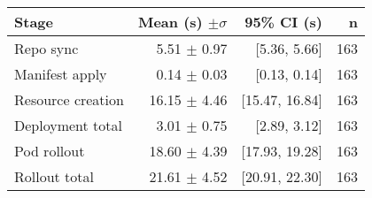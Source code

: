\begin{tabular}{l r r r}
\toprule
\textbf{Stage} & \textbf{Mean (s) $\pm \sigma$} & \textbf{95\% CI (s)} & \textbf{n} \\
\midrule
Repo sync & 5.51 $\pm$ 0.97 & [5.36, 5.66] & 163 \\
Manifest apply & 0.14 $\pm$ 0.03 & [0.13, 0.14] & 163 \\
Resource creation & 16.15 $\pm$ 4.46 & [15.47, 16.84] & 163 \\
Deployment total & 3.01 $\pm$ 0.75 & [2.89, 3.12] & 163 \\
Pod rollout & 18.60 $\pm$ 4.39 & [17.93, 19.28] & 163 \\
Rollout total & 21.61 $\pm$ 4.52 & [20.91, 22.30] & 163 \\
\bottomrule
\end{tabular}